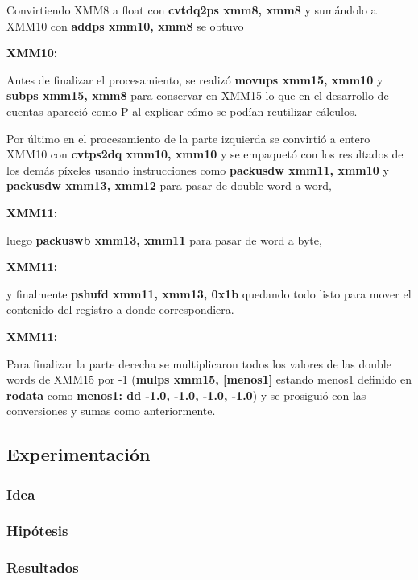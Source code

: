 \par{Convirtiendo XMM8 a float con \textbf{cvtdq2ps xmm8, xmm8} y sumándolo a XMM10 con \textbf{addps xmm10, xmm8} se obtuvo}
\par{\textbf{XMM10:}}
\par{Antes de finalizar el procesamiento, se realizó \textbf{movups xmm15, xmm10} y \textbf{subps xmm15, xmm8} para conservar en XMM15 lo que en el desarrollo de cuentas apareció como P al explicar cómo se podían reutilizar cálculos.}
\par{Por último en el procesamiento de la parte izquierda se convirtió a entero XMM10 con \textbf{cvtps2dq xmm10, xmm10} y se empaquetó con los resultados de los demás píxeles usando instrucciones como \textbf{packusdw xmm11, xmm10} y \textbf{packusdw xmm13, xmm12} para pasar de double word a word,}
\par{\textbf{XMM11:}}
\par{luego \textbf{packuswb xmm13, xmm11} para pasar de word a byte,}
\par{\textbf{XMM11:}}
\par{y finalmente \textbf{pshufd xmm11, xmm13, 0x1b} quedando todo listo para mover el contenido del registro a donde correspondiera.}
\par{\textbf{XMM11:}}
\par{Para finalizar la parte derecha se multiplicaron todos los valores de las double words de XMM15 por -1 (\textbf{mulps xmm15, [menos1]} estando menos1 definido en \textbf{rodata} como \textbf{menos1: dd -1.0, -1.0, -1.0, -1.0}) y se prosiguió con las conversiones y sumas como anteriormente.}

	
\subsection{Experimentación}
\subsubsection{Idea}	

\subsubsection{Hipótesis}
	
	
\subsubsection{Resultados}
	
